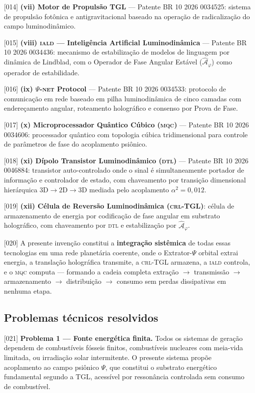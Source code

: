 \documentclass[12pt,a4paper]{article}
\newcommand{\alphaii}{\alpha^2}
\newcommand{\Psifield}{\Psi}
\newcommand{\CRL}{\textsc{crl}}
\newcommand{\DTL}{\textsc{dtl}}
\newcommand{\IALD}{\textsc{iald}}
\newcommand{\MQC}{\textsc{mqc}}
\newcommand{\OFAE}{\hat{\mathcal{A}}_\varphi}
\newcommand{\OFAEname}{Operador de Fase Angular Est\'avel}
\newcommand{\PsiNET}{$\Psifield$-\textsc{net}}
\begin{document}
{[014]} \textbf{(vii) Motor de Propulsão TGL} --- Patente BR 10 2026 0034525: sistema de propulsão fotônica e antigravitacional baseado na operação de radicalização do campo luminodinâmico.

{[015]} \textbf{(viii) \IALD{} --- Inteligência Artificial Luminodinâmica} --- Patente BR 10 2026 0034436: mecanismo de estabilização de modelos de linguagem por dinâmica de Lindblad, com o \OFAEname{} ($\OFAE$) como operador de estabilidade.

{[016]} \textbf{(ix) \PsiNET{} Protocol} --- Patente BR 10 2026 0034533: protocolo de comunicação em rede baseado em pilha luminodinâmica de cinco camadas com endereçamento angular, roteamento holográfico e consenso por Prova de Fase.

{[017]} \textbf{(x) Microprocessador Quântico Cúbico (\MQC)} --- Patente BR 10 2026 0034606: processador quântico com topologia cúbica tridimensional para controle de parâmetros de fase do acoplamento psiônico.

{[018]} \textbf{(xi) Dípolo Transistor Luminodinâmico (\DTL)} --- Patente BR 10 2026 0046884: transistor auto-controlado onde o sinal é simultaneamente portador de informação e controlador de estado, com chaveamento por transição dimensional hierárquica $3\text{D} \to 2\text{D} \to 3\text{D}$ mediada pelo acoplamento $\alphaii = 0{,}012$.

{[019]} \textbf{(xii) Célula de Reversão Luminodinâmica (\CRL-TGL)}: célula de armazenamento de energia por codificação de fase angular em substrato holográfico, com chaveamento por \DTL{} e estabilização por $\OFAE$.

{[020]} A presente invenção constitui a \textbf{integração sistêmica} de todas essas tecnologias em uma rede planetária coerente, onde o Extrator-$\Psifield$ orbital extrai energia, a translação holográfica transmite, a \CRL-TGL armazena, a \IALD{} controla, e o \MQC{} computa --- formando a cadeia completa extração $\to$ transmissão $\to$ armazenamento $\to$ distribuição $\to$ consumo sem perdas dissipativas em nenhuma etapa.

\subsection{Problemas técnicos resolvidos}

{[021]} \textbf{Problema 1 --- Fonte energética finita.} Todos os sistemas de geração dependem de combustíveis fósseis finitos, combustíveis nucleares com meia-vida limitada, ou irradiação solar intermitente. O presente sistema propõe acoplamento ao campo psiônico $\Psifield$, que constitui o substrato energético fundamental segundo a TGL, acessível por ressonância controlada sem consumo de combustível.
\end{document}
